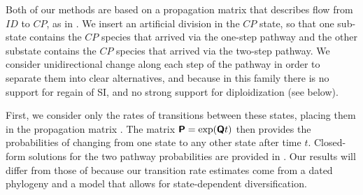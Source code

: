 Both of our methods are based on a propagation matrix that describes flow from $ID$ to $CP$, as in \citet{robertson_2011}.
We insert an artificial division in the $CP$ state, so that one sub-state contains the $CP$ species that arrived via the one-step pathway and the other substate contains the $CP$ species that arrived via the two-step pathway.
We consider unidirectional change along each step of the pathway in order to separate them into clear alternatives, and because in this family there is no support for regain of SI, and no strong support for diploidization (see below).

First, we consider only the rates of transitions between these states, placing them in the propagation matrix .
The matrix $\bm{\mathsf{P}} = \exp(\bm{\mathsf{Q}} t)$ then provides the probabilities of changing from one state to any other state after time $t$.
Closed-form solutions for the two pathway probabilities are provided in \citet{robertson_2011}.
Our results will differ from those of \citet{robertson_2011} because our transition rate estimates come from a dated phylogeny and a model that allows for state-dependent diversification.

